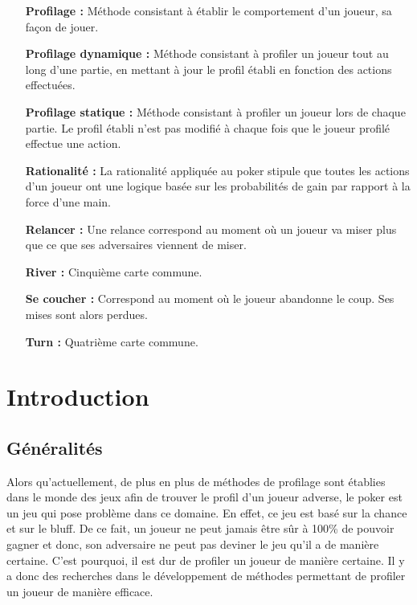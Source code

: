 \documentclass{report}
\begin{document}
\begin{itemize}
		\item[\textbf{Profilage : }]	Méthode consistant à établir le comportement d'un joueur, sa façon de jouer.
		
		\item[\textbf{Profilage dynamique : }]Méthode consistant à profiler un joueur tout au long d'une partie, en mettant à jour le profil établi en fonction des actions effectuées.\medskip
		
		\item[\textbf{Profilage statique : }]Méthode consistant à profiler un joueur lors de chaque partie. Le profil établi n'est pas modifié à chaque fois que le joueur profilé effectue une action.\medskip

		\item[\textbf{Rationalité : }]La rationalité  appliquée au poker stipule que toutes les actions d'un joueur ont une logique basée sur les probabilités de gain par rapport à la force d'une main.\medskip

		\item[\textbf{Relancer : }]Une relance correspond au moment où un joueur va miser plus que ce que ses adversaires viennent de miser.\medskip
		
		\item[\textbf{River : }]Cinquième carte commune.\medskip
		
		\item[\textbf{Se coucher : }]Correspond au moment où le joueur abandonne le coup. Ses mises sont alors perdues.\medskip

		\item[\textbf{Turn : }]Quatrième carte commune.\medskip
		
		
		

		
\end{itemize}



\chapter{Introduction}

\section{Généralités}
\hspace{0.5cm}Alors qu'actuellement, de plus en plus de méthodes de profilage sont établies dans le monde des jeux afin de trouver le profil d'un joueur adverse, le poker est un jeu qui pose problème dans ce domaine. En effet, ce jeu est basé sur la chance et sur le bluff. De ce fait, un joueur ne peut jamais être sûr à 100\% de pouvoir gagner et donc, son adversaire ne peut pas deviner le jeu qu'il a de manière certaine. C'est pourquoi, il est dur de profiler un joueur de manière certaine. Il y a donc des recherches dans le développement de méthodes permettant de profiler un joueur de manière efficace. \par
\end{document}
